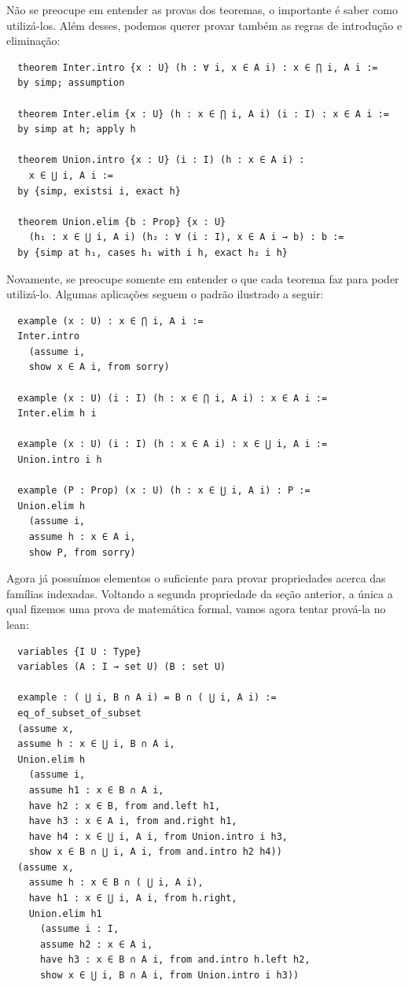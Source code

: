 Não se preocupe em entender as provas dos teoremas, o importante é saber como utilizá-los. Além desses, podemos querer provar também as regras de introdução e eliminação:

\begin{lstlisting}
  theorem Inter.intro {x : U} (h : ∀ i, x ∈ A i) : x ∈ ⋂ i, A i :=
  by simp; assumption

  theorem Inter.elim {x : U} (h : x ∈ ⋂ i, A i) (i : I) : x ∈ A i :=
  by simp at h; apply h

  theorem Union.intro {x : U} (i : I) (h : x ∈ A i) :
    x ∈ ⋃ i, A i :=
  by {simp, existsi i, exact h}

  theorem Union.elim {b : Prop} {x : U}
    (h₁ : x ∈ ⋃ i, A i) (h₂ : ∀ (i : I), x ∈ A i → b) : b :=
  by {simp at h₁, cases h₁ with i h, exact h₂ i h}\end{lstlisting}

Novamente, se preocupe somente em entender o que cada teorema faz para poder utilizá-lo. Algumas aplicações seguem o padrão ilustrado a seguir:

\begin{lstlisting}
  example (x : U) : x ∈ ⋂ i, A i :=
  Inter.intro
    (assume i,
    show x ∈ A i, from sorry)

  example (x : U) (i : I) (h : x ∈ ⋂ i, A i) : x ∈ A i :=
  Inter.elim h i

  example (x : U) (i : I) (h : x ∈ A i) : x ∈ ⋃ i, A i :=
  Union.intro i h

  example (P : Prop) (x : U) (h : x ∈ ⋃ i, A i) : P :=
  Union.elim h
    (assume i,
    assume h : x ∈ A i,
    show P, from sorry)\end{lstlisting}

Agora já possuímos elementos o suficiente para provar propriedades acerca das famílias indexadas. Voltando a segunda propriedade da seção anterior, a única a qual fizemos uma prova de matemática formal, vamos agora tentar prová-la no lean:

\begin{lstlisting}
  variables {I U : Type}
  variables (A : I → set U) (B : set U)

  example : ( ⋃ i, B ∩ A i) = B ∩ ( ⋃ i, A i) :=
  eq_of_subset_of_subset
  (assume x,
  assume h : x ∈ ⋃ i, B ∩ A i,
  Union.elim h
    (assume i,
    assume h1 : x ∈ B ∩ A i,
    have h2 : x ∈ B, from and.left h1,
    have h3 : x ∈ A i, from and.right h1,
    have h4 : x ∈ ⋃ i, A i, from Union.intro i h3,
    show x ∈ B ∩ ⋃ i, A i, from and.intro h2 h4))
  (assume x,
    assume h : x ∈ B ∩ ( ⋃ i, A i),
    have h1 : x ∈ ⋃ i, A i, from h.right,
    Union.elim h1
      (assume i : I,
      assume h2 : x ∈ A i,
      have h3 : x ∈ B ∩ A i, from and.intro h.left h2,
      show x ∈ ⋃ i, B ∩ A i, from Union.intro i h3))\end{lstlisting}

